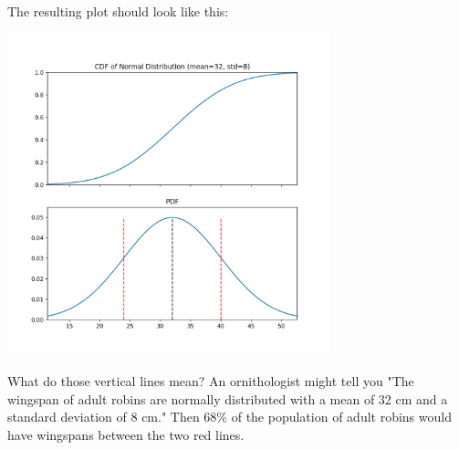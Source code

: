 The resulting plot should look like this:

\includegraphics[width=0.7\textwidth]{norm_32_8.png}

What do those vertical lines mean?  An ornithologist might tell you "The wingspan of adult robins are normally distributed with a mean of 32 cm and a
 standard deviation of 8 cm."  Then 68\% of the population of adult robins would have wingspans between the two red lines.
 

